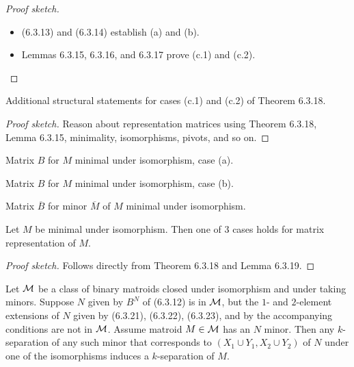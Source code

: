 \begin{proof}[Proof sketch]
  \begin{itemize}
    \item (6.3.13) and (6.3.14) establish (a) and (b).
    \item Lemmas 6.3.15, 6.3.16, and 6.3.17 prove (c.1) and (c.2).
  \end{itemize}
\end{proof}

\begin{lemma}[6.3.19]
  \label{lem:6.3.19}
  Additional structural statements for cases (c.1) and (c.2) of Theorem 6.3.18.
\end{lemma}

\begin{proof}[Proof sketch]
  Reason about representation matrices using Theorem 6.3.18, Lemma 6.3.15, minimality, isomorphisms, pivots, and so on.
\end{proof}

\begin{proposition}[6.3.21]
  \label{prop:6.3.21}
  Matrix $B$ for $M$ minimal under isomorphism, case (a).
\end{proposition}

\begin{proposition}[6.3.22]
  \label{prop:6.3.22}
  Matrix $B$ for $M$ minimal under isomorphism, case (b).
\end{proposition}

\begin{proposition}[6.3.23]
  \label{prop:6.3.23}
  Matrix $\overline{B}$ for minor $\overline{M}$ of $M$ minimal under isomorphism.
\end{proposition}

\begin{theorem}[6.3.20]
  \label{thm:6.3.20}
  Let $M$ be minimal under isomorphism. Then one of $3$ cases holds for matrix representation of $M$.
\end{theorem}

\begin{proof}[Proof sketch]
  Follows directly from Theorem 6.3.18 and Lemma 6.3.19.
\end{proof}

\begin{corollary}[6.3.24]
  \label{cor:6.3.24}
  Let $\mathcal{M}$ be a class of binary matroids closed under isomorphism and under taking minors. Suppose $N$ given by $B^{N}$ of (6.3.12) is in $\mathcal{M}$, but the $1$- and $2$-element extensions of $N$ given by (6.3.21), (6.3.22), (6.3.23), and by the accompanying conditions are not in $\mathcal{M}$. Assume matroid $M \in \mathcal{M}$ has an $N$ minor.
  Then any $k$-separation of any such minor that corresponds to $(X_{1} \cup Y_{1}, X_{2} \cup Y_{2})$ of $N$ under one of the isomorphisms induces a $k$-separation of $M$.
\end{corollary}

